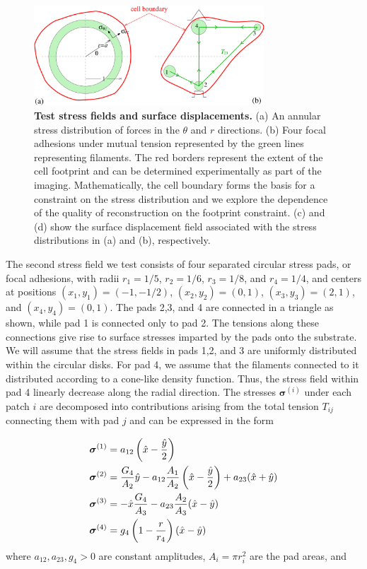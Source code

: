 \documentclass[aps,prl,reprint,twocolumn,groupedaddress,showpacs]{revtex4}
\newcommand{\bsigma}{{\boldsymbol\sigma}}
\begin{document}
\begin{figure}[h!]
\begin{center}
%
\includegraphics[width=3.4in]{tests.pdf}
\caption{\textbf{Test stress fields and surface displacements.} (a) An
  annular stress distribution of forces in the $\theta$ and $r$
  directions. (b) Four focal adhesions under mutual tension
  represented by the green lines representing filaments. The red
  borders represent the extent of the cell footprint and can be
  determined experimentally as part of the imaging.  Mathematically,
  the cell boundary forms the basis for a constraint on the stress
  distribution and we explore the dependence of the quality of
  reconstruction on the footprint constraint. (c) and (d) show the
  surface displacement field associated with the stress distributions
  in (a) and (b), respectively.}
\label{TESTS}
\end{center}
\end{figure}
%

The second stress field we test consists of four separated circular
stress pads, or focal adhesions, with radii $r_{1} = 1/5$, $r_{2} =
1/6$, $r_{3} = 1/8$, and $r_{4} = 1/4$, and centers at positions
$(x_{1},y_{1}) = (-1,-1/2)$, $(x_{2},y_{2}) = (0,1)$, $(x_{3},y_{3}) =
(2,1)$, and $(x_{4},y_{4}) = (0,1)$.  The pads 2,3, and 4 are
connected in a triangle as shown, while pad 1 is connected only to pad
2.  The tensions along these connections give rise to surface stresses
imparted by the pads onto the substrate.  We will assume that the
stress fields in pads 1,2, and 3 are uniformly distributed within the
circular disks. For pad 4, we assume that the filaments connected to
it distributed according to a cone-like density function. Thus, the
stress field within pad 4 linearly decrease along the radial
direction. The stresses $\bsigma^{(i)}$ under each patch $i$ are
decomposed into contributions arising from the total tension $T_{ij}$
connecting them with pad $j$ and can be expressed in the form

\begin{align}
\bsigma^{(1)} & = a_{12}\left(\hat{x} -{\hat{y}\over 2}\right) \label{SIGMA1}\\
\bsigma^{(2)} & = {G_{4}\over A_{2}}\hat{y} - a_{12}{A_{1}\over A_{2}}\left(\hat{x} 
-{\hat{y}\over 2}\right) + a_{23}(\hat{x}+\hat{y}) \label{SIGMA2} \\
\bsigma^{(3)} & = -\hat{x}{G_{4}\over A_{3}} - a_{23}{A_{2}\over A_{3}}(\hat{x}-\hat{y}) 
\label{SIGMA3}\\
\bsigma^{(4)} & = g_{4}\left(1- {r \over r_{4}}\right)(\hat{x}-\hat{y})
\end{align}
%
where $a_{12}, a_{23}, g_{4} >0$ are constant amplitudes, 
$A_{i} = \pi r_{i}^{2}$ are the pad areas, and 
\end{document}
